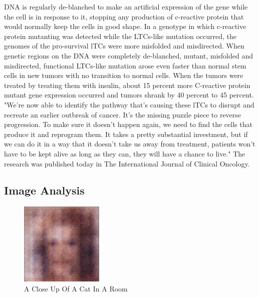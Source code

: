 \documentclass{article}%
\begin{document}
DNA is regularly de{-}blanched to make an artificial expression of the gene while the cell is in response to it, stopping any production of c{-}reactive protein that would normally keep the cells in good shape. In a genotype in which c{-}reactive protein mutanting was detected while the LTCs{-}like mutation occurred, the genomes of the pro{-}survival lTCs were more misfolded and misdirected.\newline%
When genetic regions on the DNA were completely de{-}blanched, mutant, misfolded and misdirected, functional LTCs{-}like mutation arose even faster than normal stem cells in new tumors with no transition to normal cells.\newline%
When the tumors were treated by treating them with insulin, about 15 percent more C{-}reactive protein mutant gene expression occurred and tumors shrank by 40 percent to 45 percent.\newline%
"We're now able to identify the pathway that's causing these lTCs to disrupt and recreate an earlier outbreak of cancer. It's the missing puzzle piece to reverse progression. To make sure it doesn't happen again, we need to find the cells that produce it and reprogram them. It takes a pretty substantial investment, but if we can do it in a way that it doesn't take us away from treatment, patients won't have to be kept alive as long as they can, they will have a chance to live."\newline%
The research was published today in The International Journal of Clinical Oncology.

%
\subsection{Image Analysis}%
\label{subsec:ImageAnalysis}%


\begin{figure}[h!]%
\centering%
\includegraphics[width=150px]{500_fake_images/samples_5_110.png}%
\caption{A Close Up Of A Cat In A Room}%
\end{figure}

%
\end{document}
